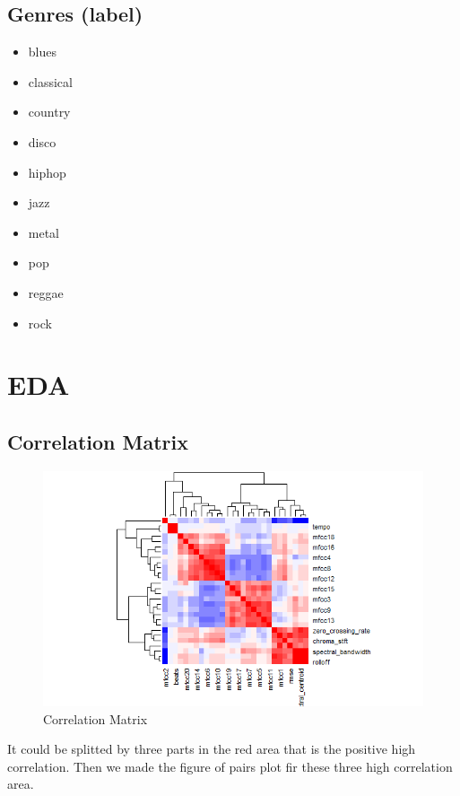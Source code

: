 \documentclass[12pt,a4paper]{article}
\begin{document}
\subsection{Genres (label)}
\begin{itemize}
  \item blues
  \item classical
  \item country
  \item disco
  \item hiphop
  \item jazz
  \item metal
  \item pop
  \item reggae
  \item rock 
\end{itemize}

\newpage
\section{EDA}
\subsection{Correlation Matrix}
\begin{figure}[h]
    \begin{center}
        \includegraphics[width=1.2\textwidth]{correlation_matrix.png}
    \end{center}
    \caption{Correlation Matrix}
\end{figure}

It could be splitted by three parts in the red area that is the positive high correlation. Then we made the figure of pairs plot fir these three high correlation area.
\newpage
\end{document}
